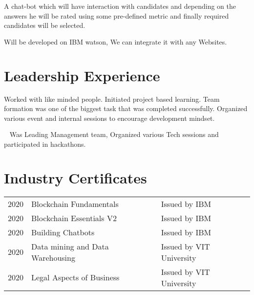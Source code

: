 \documentclass[]{deedy-resume-openfont}
\begin{document}
\begin{minipage}[t]{0.66\textwidth}
\begin{tightemize}
\item A chat-bot which will have interaction with candidates and depending on the answers he will be rated using some pre-defined metric and finally required candidates will be selected.
\item Will be developed on IBM watson, We can integrate it with any Websites. 

\end{tightemize}


\sectionsep


\section{Leadership Experience}
\vspace{\topsep}
Worked with like minded people. Initiated project based learning. Team formation was one of the biggest task that was completed successfully. Organized various event and internal sessions to encourage development mindset.  
\sectionsep

\
\vspace{\topsep}
Was Leading Management team, Organized various Tech sessions and participated in hackathons. 
\sectionsep


\section{Industry Certificates} 
\begin{tabular}{rll}
2020	     & Blockchain Fundamentals  & Issued by IBM\\
2020	     & Blockchain Essentials V2  & Issued by IBM\\
2020	     & Building Chatbots  &Issued by IBM \\
2020     & Data mining and Data Warehousing & Issued by VIT University  \\

2020     & Legal Aspects of Business & Issued by VIT University  \\
\end{tabular}
\sectionsep


\end{minipage}
\end{document}
